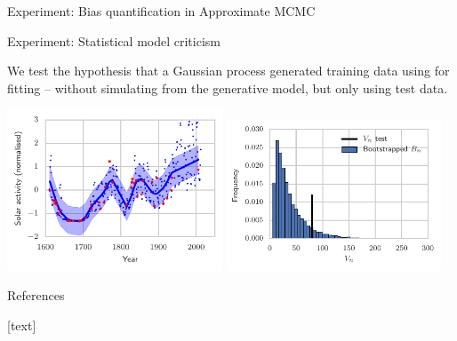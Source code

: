 \begin{frame}
\begin{columns}
\begin{column}{.32\linewidth}
\begin{block}{Experiment: Bias quantification in Approximate MCMC}
\begin{minipage}{.35\linewidth}
\end{minipage}
\end{block}
\vspace{-0.75cm}
\begin{block}{Experiment: Statistical model criticism}
\begin{center}
\item We test the hypothesis that a Gaussian process generated {\color{red}training data} using for fitting -- without simulating from the generative model, but only using {\color{blue} test data}.
\end{center}
\includegraphics[width=0.48\textwidth]{img/gp_regression_data_fit.pdf} \includegraphics[width=0.48\textwidth]{img/gp_regression_bootstrap_hist} 
\begin{minipage}{.35\linewidth}

\end{minipage}
\end{block}
\vspace{-0.75cm}
\begin{block}{References}
\begin{minipage}{.9\linewidth}
{\footnotesize
\begin{multicols}{2}
[text] 
 
\scriptsize
 \ 
\end{multicols}
} 
\end{minipage}
\end{block}

\end{column}
\end{columns}

\end{frame}

